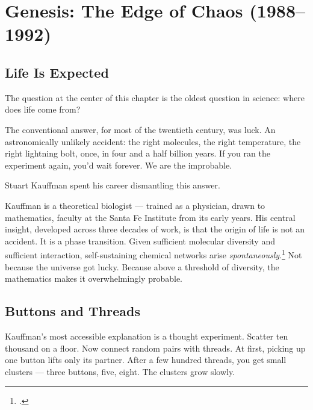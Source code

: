 

\chapter{Genesis: The Edge of Chaos (1988--1992)}
\label{t1:ch01:genesis}
\label{pos13:genesis}

\vspace{0.5cm}

\section*{Life Is Expected}
\label{pos13:life-is-expected}

The question at the center of this chapter is the oldest question in science: where does life come from?

The conventional answer, for most of the twentieth century, was luck. An astronomically unlikely accident: the right molecules, the right temperature, the right lightning bolt, once, in four and a half billion years. If you ran the experiment again, you'd wait forever. We are the improbable.

Stuart Kauffman spent his career dismantling this answer.

Kauffman is a theoretical biologist --- trained as a physician, drawn to mathematics, faculty at the Santa Fe Institute from its early years. His central insight, developed across three decades of work, is that the origin of life is not an accident. It is a phase transition. Given sufficient molecular diversity and sufficient interaction, self-sustaining chemical networks arise \textit{spontaneously}.\footcite{kauffman1993} Not because the universe got lucky. Because above a threshold of diversity, the mathematics makes it overwhelmingly probable.

\section*{Buttons and Threads}
\label{pos13:buttons-and-threads}

Kauffman's most accessible explanation is a thought experiment. Scatter ten thousand  on a floor. Now connect random pairs with threads. At first, picking up one button lifts only its partner. After a few hundred threads, you get small clusters --- three buttons, five, eight. The clusters grow slowly.


